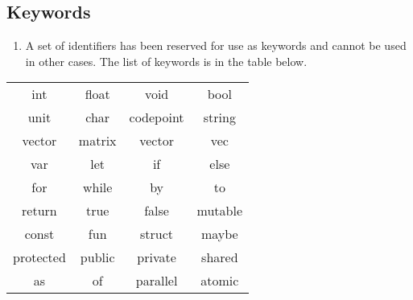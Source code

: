 \subsection{Keywords}
\begin{enumerate}
	\item A set of identifiers has been reserved for use as keywords and cannot be used in other cases. The list of keywords is in the table below.
\end{enumerate}

\begin{center}
\begin{tabular}{ c c c c } 
 int & float & void & bool \\
 unit & char & codepoint & string \\
 vector & matrix & vector & vec \\
 var & let & if & else \\
 for & while & by & to \\
 return & true & false & mutable\\
 const & fun & struct & maybe\\
 protected & public & private & shared\\
 as & of & parallel & atomic\\
\end{tabular}
\end{center}

